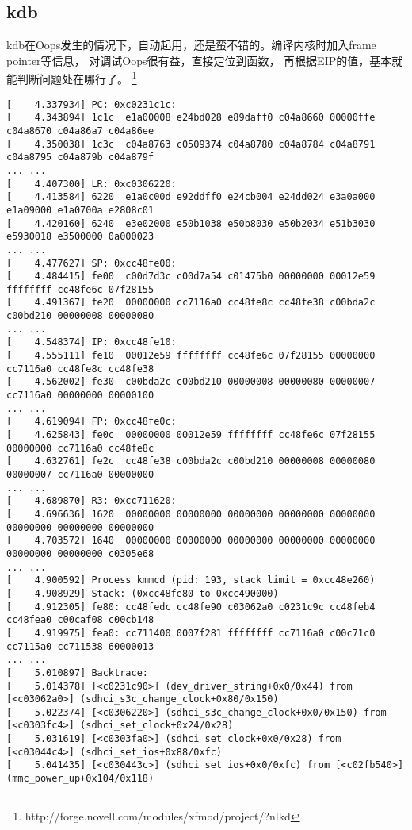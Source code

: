 \documentclass[a4paper,titlepage]{article}
\begin{document}
\subsection{kdb}
kdb在Oops发生的情况下，自动起用，还是蛮不错的。编译内核时加入frame pointer等信息， 对调试Oops很有益，直接定位到函数， 再根据EIP的值，基本就能判断问题处在哪行了。
\footnote{http://forge.novell.com/modules/xfmod/project/?nlkd}
\begin{lstlisting}[basicstyle=\tiny, caption=oops log]
[    4.337934] PC: 0xc0231c1c: 
[    4.343894] 1c1c  e1a00008 e24bd028 e89daff0 c04a8660 00000ffe c04a8670 c04a86a7 c04a86ee 
[    4.350038] 1c3c  c04a8763 c0509374 c04a8780 c04a8784 c04a8791 c04a8795 c04a879b c04a879f
... ...
[    4.407300] LR: 0xc0306220: 
[    4.413584] 6220  e1a0c00d e92ddff0 e24cb004 e24dd024 e3a0a000 e1a09000 e1a0700a e2808c01 
[    4.420160] 6240  e3e02000 e50b1038 e50b8030 e50b2034 e51b3030 e5930018 e3500000 0a000023 
... ...
[    4.477627] SP: 0xcc48fe00: 
[    4.484415] fe00  c00d7d3c c00d7a54 c01475b0 00000000 00012e59 ffffffff cc48fe6c 07f28155 
[    4.491367] fe20  00000000 cc7116a0 cc48fe8c cc48fe38 c00bda2c c00bd210 00000008 00000080 
... ...
[    4.548374] IP: 0xcc48fe10: 
[    4.555111] fe10  00012e59 ffffffff cc48fe6c 07f28155 00000000 cc7116a0 cc48fe8c cc48fe38 
[    4.562002] fe30  c00bda2c c00bd210 00000008 00000080 00000007 cc7116a0 00000000 00000100 
... ...
[    4.619094] FP: 0xcc48fe0c: 
[    4.625843] fe0c  00000000 00012e59 ffffffff cc48fe6c 07f28155 00000000 cc7116a0 cc48fe8c 
[    4.632761] fe2c  cc48fe38 c00bda2c c00bd210 00000008 00000080 00000007 cc7116a0 00000000
... ...
[    4.689870] R3: 0xcc711620: 
[    4.696636] 1620  00000000 00000000 00000000 00000000 00000000 00000000 00000000 00000000 
[    4.703572] 1640  00000000 00000000 00000000 00000000 00000000 00000000 00000000 c0305e68
... ...
[    4.900592] Process kmmcd (pid: 193, stack limit = 0xcc48e260) 
[    4.908929] Stack: (0xcc48fe80 to 0xcc490000) 
[    4.912305] fe80: cc48fedc cc48fe90 c03062a0 c0231c9c cc48feb4 cc48fea0 c00caf08 c00cb148 
[    4.919975] fea0: cc711400 0007f281 ffffffff cc7116a0 c00c71c0 cc7115a0 cc711538 60000013 
... ...
[    5.010897] Backtrace: 
[    5.014378] [<c0231c90>] (dev_driver_string+0x0/0x44) from [<c03062a0>] (sdhci_s3c_change_clock+0x80/0x150) 
[    5.022374] [<c0306220>] (sdhci_s3c_change_clock+0x0/0x150) from [<c0303fc4>] (sdhci_set_clock+0x24/0x28) 
[    5.031619] [<c0303fa0>] (sdhci_set_clock+0x0/0x28) from [<c03044c4>] (sdhci_set_ios+0x88/0xfc) 
[    5.041435] [<c030443c>] (sdhci_set_ios+0x0/0xfc) from [<c02fb540>] (mmc_power_up+0x104/0x118) 

\end{lstlisting}
\end{document}
